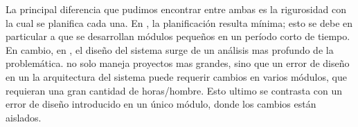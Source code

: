 	La principal diferencia que pudimos encontrar entre ambas es la rigurosidad con la cual se planifica cada una. En \pis, la planificación resulta mínima; esto se debe en particular a que se desarrollan módulos pequeños en un período corto de tiempo. En cambio, en \pil, el diseño del sistema surge de un análisis mas profundo de la problemática. \pil no solo maneja proyectos mas grandes, sino que un error de diseño en un la arquitectura del sistema puede requerir cambios en varios módulos, que requieran una gran cantidad de horas/hombre. Esto ultimo se contrasta con un error de diseño introducido en un único módulo, donde los cambios están aislados.

